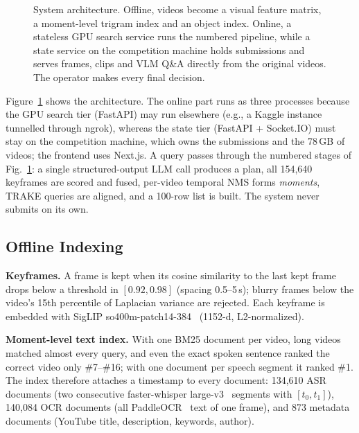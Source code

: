 \documentclass[runningheads]{llncs}
\begin{document}
\begin{figure}[t]
{%
}
\caption{System architecture. Offline, videos become a visual feature matrix, a moment-level trigram index and an object index. Online, a stateless GPU search service runs the numbered pipeline, while a state service on the competition machine holds submissions and serves frames, clips and VLM Q\&A directly from the original videos. The operator makes every final decision.}
\label{fig:arch}
\end{figure}

Figure~\ref{fig:arch} shows the architecture. The online part runs as three processes because the GPU search tier (FastAPI) may run elsewhere (e.g., a Kaggle instance tunnelled through ngrok), whereas the state tier (FastAPI + Socket.IO) must stay on the competition machine, which owns the submissions and the 78\,GB of videos; the frontend uses Next.js. A query passes through the numbered stages of Fig.~\ref{fig:arch}: a single structured-output LLM call produces a plan, all 154,640 keyframes are scored and fused, per-video temporal NMS forms \emph{moments}, TRAKE queries are aligned, and a 100-row list is built. The system never submits on its own.

\subsection{Offline Indexing}
\textbf{Keyframes.} A frame is kept when its cosine similarity to the last kept frame drops below a threshold in $[0.92,0.98]$ (spacing 0.5--5\,s); blurry frames below the video's 15th percentile of Laplacian variance are rejected. Each keyframe is embedded with SigLIP so400m-patch14-384~\cite{zhai2023siglip} (1152-d, L2-normalized).

\textbf{Moment-level text index.} With one BM25 document per video, long videos matched almost every query, and even the exact spoken sentence ranked the correct video only \#7--\#16; with one document per speech segment it ranked \#1. The index therefore attaches a timestamp to every document: 134,610 ASR documents (two consecutive faster-whisper large-v3~\cite{radford2023whisper} segments with $[t_0,t_1]$), 140,084 OCR documents (all PaddleOCR~\cite{du2020ppocr} text of one frame), and 873 metadata documents (YouTube title, description, keywords, author).
\end{document}
